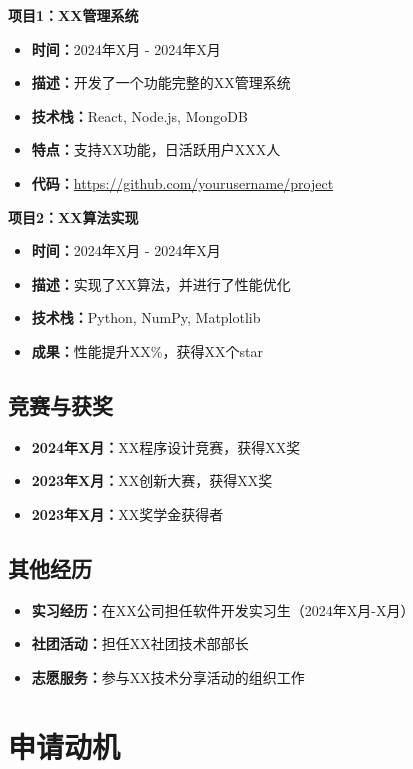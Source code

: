 \documentclass[a4paper,12pt]{article}
\begin{document}
\textbf{项目1：XX管理系统}
\begin{itemize}
    \item \textbf{时间：}2024年X月 - 2024年X月
    \item \textbf{描述：}开发了一个功能完整的XX管理系统
    \item \textbf{技术栈：}React, Node.js, MongoDB
    \item \textbf{特点：}支持XX功能，日活跃用户XXX人
    \item \textbf{代码：}\url{https://github.com/yourusername/project}
\end{itemize}

\textbf{项目2：XX算法实现}
\begin{itemize}
    \item \textbf{时间：}2024年X月 - 2024年X月
    \item \textbf{描述：}实现了XX算法，并进行了性能优化
    \item \textbf{技术栈：}Python, NumPy, Matplotlib
    \item \textbf{成果：}性能提升XX\%，获得XX个star
\end{itemize}

\subsection{竞赛与获奖}
\begin{itemize}
    \item \textbf{2024年X月：}XX程序设计竞赛，获得XX奖
    \item \textbf{2023年X月：}XX创新大赛，获得XX奖
    \item \textbf{2023年X月：}XX奖学金获得者
\end{itemize}

\subsection{其他经历}
\begin{itemize}
    \item \textbf{实习经历：}在XX公司担任软件开发实习生（2024年X月-X月）
    \item \textbf{社团活动：}担任XX社团技术部部长
    \item \textbf{志愿服务：}参与XX技术分享活动的组织工作
\end{itemize}

\section{申请动机}
\end{document}
